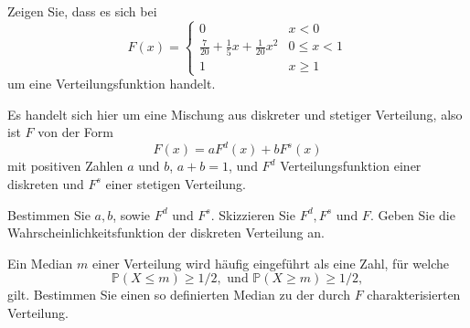 \begin{Problem}
	\begin{parts}
	\item Zeigen Sie, dass es sich bei
	\[F(x)=\begin{cases}
		0 & x < 0\\
		\frac{7}{20}+\frac{1}{5}x+\frac{1}{20}x^2 & 0 \le x < 1\\
		1 & x \ge 1
	\end{cases}\]
um eine Verteilungsfunktion handelt.
\item Es handelt sich hier um eine Mischung aus diskreter und stetiger Verteilung, also ist $F$ von der Form
\[F(x)=a F^d(x)+b F^s(x)\]
mit positiven Zahlen $a$ und $b$, $a+b=1$, und $F^d$ Verteilungsfunktion einer diskreten und $F^s$ einer stetigen Verteilung.

Bestimmen Sie $a,b$, sowie $F^d$ und $F^s$. Skizzieren Sie $F^d, F^s$ und $F$. Geben Sie die Wahrscheinlichkeitsfunktion der diskreten Verteilung an.
\item Ein Median $m$ einer Verteilung wird häufig eingeführt als eine Zahl, für welche
\[\mathbb{P}(X\le m)\ge 1/2,\text{ und }\mathbb{P}(X\ge m)\ge 1/2,\]
gilt. Bestimmen Sie einen so definierten Median zu der durch $F$ charakterisierten Verteilung.
\end{parts}
\end{Problem}
